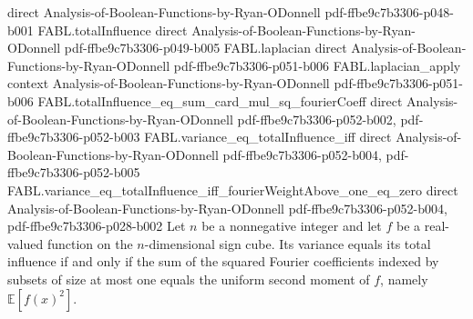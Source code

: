 \begin{theorem}
  {direct}
  {Analysis-of-Boolean-Functions-by-Ryan-ODonnell}
  {pdf-ffbe9c7b3306-p048-b001}
\proofstep
  {FABL.totalInfluence}
  {direct}
  {Analysis-of-Boolean-Functions-by-Ryan-ODonnell}
  {pdf-ffbe9c7b3306-p049-b005}
\proofstep
  {FABL.laplacian}
  {direct}
  {Analysis-of-Boolean-Functions-by-Ryan-ODonnell}
  {pdf-ffbe9c7b3306-p051-b006}
\proofstep
  {FABL.laplacian_apply}
  {context}
  {Analysis-of-Boolean-Functions-by-Ryan-ODonnell}
  {pdf-ffbe9c7b3306-p051-b006}
\proofstep
  {FABL.totalInfluence_eq_sum_card_mul_sq_fourierCoeff}
  {direct}
  {Analysis-of-Boolean-Functions-by-Ryan-ODonnell}
  {pdf-ffbe9c7b3306-p052-b002,
    pdf-ffbe9c7b3306-p052-b003}
\proofstep
  {FABL.variance_eq_totalInfluence_iff}
  {direct}
  {Analysis-of-Boolean-Functions-by-Ryan-ODonnell}
  {pdf-ffbe9c7b3306-p052-b004,
    pdf-ffbe9c7b3306-p052-b005}
\proofstep
  {FABL.variance_eq_totalInfluence_iff_fourierWeightAbove_one_eq_zero}
  {direct}
  {Analysis-of-Boolean-Functions-by-Ryan-ODonnell}
  {pdf-ffbe9c7b3306-p052-b004,
    pdf-ffbe9c7b3306-p028-b002}
Let $n$ be a nonnegative integer and let $f$ be a real-valued function on the
$n$-dimensional sign cube. Its variance equals its total influence if and only if the
sum of the squared Fourier coefficients indexed by subsets of size at most one equals
the uniform second moment of $f$, namely $\mathbb{E}[f(x)^2]$.
\end{theorem}

